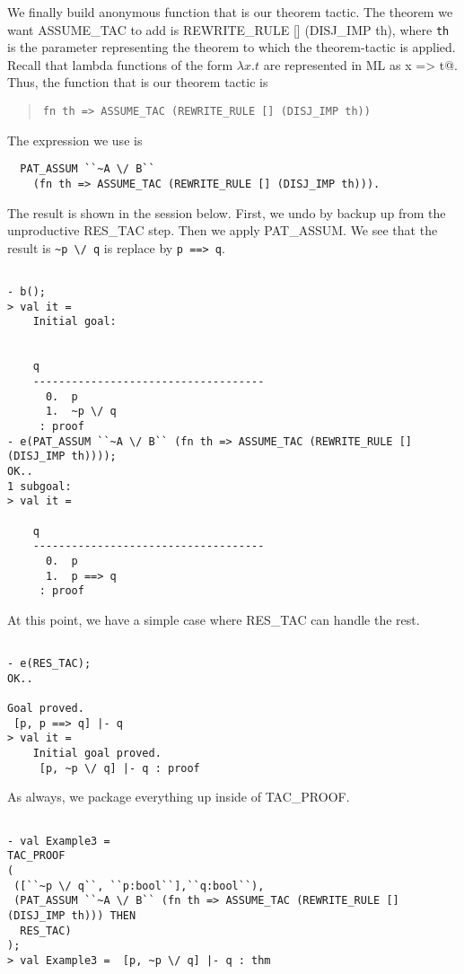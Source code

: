 We finally build anonymous function that is our theorem tactic.  The
theorem we want ASSUME\_TAC to add is REWRITE\_RULE [] (DISJ\_IMP th),
where \texttt{th} is the parameter representing the theorem to which
the theorem-tactic is applied.  Recall that lambda functions of the
form $\lambda x.t$ are represented in ML as \verb@fn x => t@. Thus,
the function that is our theorem tactic is
\begin{quote}
  \verb|fn th => ASSUME_TAC (REWRITE_RULE [] (DISJ_IMP th))|
\end{quote}
The expression we use is
\begin{verbatim}
  PAT_ASSUM ``~A \/ B`` 
    (fn th => ASSUME_TAC (REWRITE_RULE [] (DISJ_IMP th))).
\end{verbatim}
The result is shown in the session below. First, we undo by backup up
from the unproductive RES\_TAC step. Then we apply PAT\_ASSUM. We see
that the result is \verb|~p \/ q| is replace by \verb|p ==> q|.
\begin{session}
  \begin{scriptsize}
\begin{verbatim}

- b();
> val it =
    Initial goal:
    
    
    q
    ------------------------------------
      0.  p
      1.  ~p \/ q
     : proof
- e(PAT_ASSUM ``~A \/ B`` (fn th => ASSUME_TAC (REWRITE_RULE [] (DISJ_IMP th))));
OK..
1 subgoal:
> val it =
    
    q
    ------------------------------------
      0.  p
      1.  p ==> q
     : proof
\end{verbatim}
  \end{scriptsize}
\end{session}
At this point, we have a simple case where RES\_TAC can handle the rest.
\begin{session}
  \begin{scriptsize}
\begin{verbatim}

- e(RES_TAC);
OK..

Goal proved.
 [p, p ==> q] |- q
> val it =
    Initial goal proved.
     [p, ~p \/ q] |- q : proof
\end{verbatim}
  \end{scriptsize}
\end{session}
As always, we package everything up inside of TAC\_PROOF.
\begin{session}
  \begin{scriptsize}
\begin{verbatim}

- val Example3 =
TAC_PROOF
(
 ([``~p \/ q``, ``p:bool``],``q:bool``),
 (PAT_ASSUM ``~A \/ B`` (fn th => ASSUME_TAC (REWRITE_RULE [] (DISJ_IMP th))) THEN
  RES_TAC)
);
> val Example3 =  [p, ~p \/ q] |- q : thm
\end{verbatim}
  \end{scriptsize}
\end{session}


